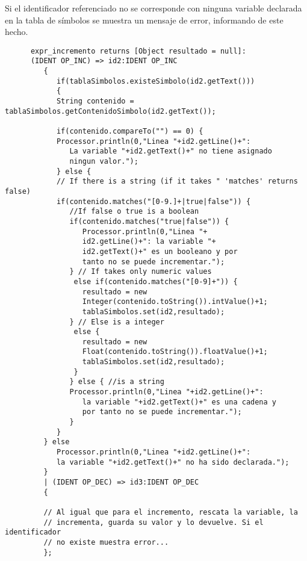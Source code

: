    Si el identificador referenciado no se corresponde con ninguna variable declarada en la tabla de símbolos se 
   muestra un mensaje de error, informando de este hecho.
   \begin{lstlisting}
      expr_incremento returns [Object resultado = null]:
      (IDENT OP_INC) => id2:IDENT OP_INC
         {
            if(tablaSimbolos.existeSimbolo(id2.getText()))
            {
            String contenido = tablaSimbolos.getContenidoSimbolo(id2.getText());
            
            if(contenido.compareTo("") == 0) {
            Processor.println(0,"Linea "+id2.getLine()+": 
               La variable "+id2.getText()+" no tiene asignado 
               ningun valor.");  
            } else {
            // If there is a string (if it takes " 'matches' returns false)
            if(contenido.matches("[0-9.]+|true|false")) {
               //If false o true is a boolean
               if(contenido.matches("true|false")) {
                  Processor.println(0,"Linea "+
                  id2.getLine()+": la variable "+
                  id2.getText()+" es un booleano y por 
                  tanto no se puede incrementar.");
               } // If takes only numeric values
                else if(contenido.matches("[0-9]+")) {
                  resultado = new
                  Integer(contenido.toString()).intValue()+1;
                  tablaSimbolos.set(id2,resultado);
               } // Else is a integer
                else {
                  resultado = new
                  Float(contenido.toString()).floatValue()+1;
                  tablaSimbolos.set(id2,resultado);
                }
               } else { //is a string
               Processor.println(0,"Linea "+id2.getLine()+":
                  la variable "+id2.getText()+" es una cadena y 
                  por tanto no se puede incrementar.");
               }
            }
         } else 
            Processor.println(0,"Linea "+id2.getLine()+":
            la variable "+id2.getText()+" no ha sido declarada.");
         }
         | (IDENT OP_DEC) => id3:IDENT OP_DEC
         {
         
         // Al igual que para el incremento, rescata la variable, la
         // incrementa, guarda su valor y lo devuelve. Si el identificador
         // no existe muestra error...    
         };
   \end{lstlisting}

